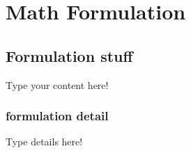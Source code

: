 \chapter{Math Formulation} \label{ch:formulation}

\section{Formulation stuff}
Type your content here!

\subsection{formulation detail}
Type details here!
